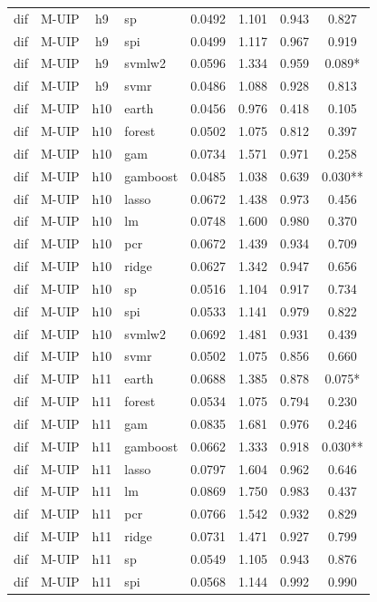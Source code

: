 \begin{ThreePartTable}
\begin{longtable}[t]{llclcccc}
dif & M-UIP & h9 & sp & 0.0492 & 1.101 & 0.943 & 0.827\\
dif & M-UIP & h9 & spi & 0.0499 & 1.117 & 0.967 & 0.919\\
dif & M-UIP & h9 & svmlw2 & 0.0596 & 1.334 & 0.959 & 0.089*\\
dif & M-UIP & h9 & svmr & 0.0486 & 1.088 & 0.928 & 0.813\\
\addlinespace
dif & M-UIP & h10 & earth & 0.0456 & 0.976 & 0.418 & 0.105\\
dif & M-UIP & h10 & forest & 0.0502 & 1.075 & 0.812 & 0.397\\
dif & M-UIP & h10 & gam & 0.0734 & 1.571 & 0.971 & 0.258\\
dif & M-UIP & h10 & gamboost & 0.0485 & 1.038 & 0.639 & 0.030**\\
dif & M-UIP & h10 & lasso & 0.0672 & 1.438 & 0.973 & 0.456\\
dif & M-UIP & h10 & lm & 0.0748 & 1.600 & 0.980 & 0.370\\
dif & M-UIP & h10 & pcr & 0.0672 & 1.439 & 0.934 & 0.709\\
dif & M-UIP & h10 & ridge & 0.0627 & 1.342 & 0.947 & 0.656\\
dif & M-UIP & h10 & sp & 0.0516 & 1.104 & 0.917 & 0.734\\
dif & M-UIP & h10 & spi & 0.0533 & 1.141 & 0.979 & 0.822\\
dif & M-UIP & h10 & svmlw2 & 0.0692 & 1.481 & 0.931 & 0.439\\
dif & M-UIP & h10 & svmr & 0.0502 & 1.075 & 0.856 & 0.660\\
\addlinespace
dif & M-UIP & h11 & earth & 0.0688 & 1.385 & 0.878 & 0.075*\\
dif & M-UIP & h11 & forest & 0.0534 & 1.075 & 0.794 & 0.230\\
dif & M-UIP & h11 & gam & 0.0835 & 1.681 & 0.976 & 0.246\\
dif & M-UIP & h11 & gamboost & 0.0662 & 1.333 & 0.918 & 0.030**\\
dif & M-UIP & h11 & lasso & 0.0797 & 1.604 & 0.962 & 0.646\\
dif & M-UIP & h11 & lm & 0.0869 & 1.750 & 0.983 & 0.437\\
dif & M-UIP & h11 & pcr & 0.0766 & 1.542 & 0.932 & 0.829\\
dif & M-UIP & h11 & ridge & 0.0731 & 1.471 & 0.927 & 0.799\\
dif & M-UIP & h11 & sp & 0.0549 & 1.105 & 0.943 & 0.876\\
dif & M-UIP & h11 & spi & 0.0568 & 1.144 & 0.992 & 0.990\\

\end{longtable}
\end{ThreePartTable}
